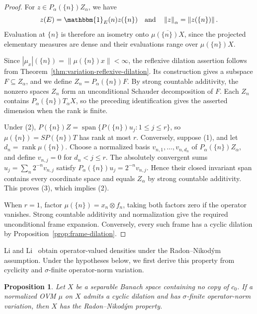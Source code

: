 \documentclass[11pt,leqno]{amsart}
\theoremstyle{compact}
\numberwithin{equation}{section}
\newtheorem{proposition}[theorem]{Proposition}
\theoremstyle{compactremark}
\theoremstyle{compact}
\DeclareMathOperator{\spn}{span}
\newcommand{\1}{\mathbbm{1}}
\newcommand{\norm}[1]{\left\|#1\right\|}
\newcommand{\abs}[1]{\left|#1\right|}
\begin{document}
\begin{proof}
For $z\in P_\alpha(\{n\})Z_\alpha$, we have
\[
z(E)=\1_E(n)z(\{n\})\quad\text{and}\quad\norm{z}_\alpha=\norm{z(\{n\})}.
\]
Evaluation at $\{n\}$ is therefore an isometry onto $\overline{\mu(\{n\})X}$, since the projected elementary measures are dense and their evaluations range over $\mu(\{n\})X$.

Since $\abs{\mu_x}(\{n\})=\norm{\mu(\{n\})x}<\infty$, the reflexive dilation assertion follows from Theorem~\ref{thm:variation-reflexive-dilation}. Its construction gives a subspace $F\subseteq Z_\alpha$, and we define $Z_n=P_\alpha(\{n\})F$. By strong countable additivity, the nonzero spaces $Z_n$ form an unconditional Schauder decomposition of $F$. Each $Z_n$ contains $P_\alpha(\{n\})T_\alpha X$, so the preceding identification gives the asserted dimension when the rank is finite.

Under (2), $P(\{n\})Z=\spn\{P(\{n\})u_j:1\leq j\leq r\}$, so $\mu(\{n\})=SP(\{n\})T$ has rank at most $r$. Conversely, suppose (1), and let $d_n=\operatorname{rank}\mu(\{n\})$. Choose a normalized basis $v_{n,1},\ldots,v_{n,d_n}$ of $P_\alpha(\{n\})Z_\alpha$, and define $v_{n,j}=0$ for $d_n<j\leq r$. The absolutely convergent sums $u_j=\sum_n2^{-n}v_{n,j}$ satisfy $P_\alpha(\{n\})u_j=2^{-n}v_{n,j}$. Hence their closed invariant span contains every coordinate space and equals $Z_\alpha$ by strong countable additivity. This proves (3), which implies (2).

When $r=1$, factor $\mu(\{n\})=x_n\otimes f_n$, taking both factors zero if the operator vanishes. Strong countable additivity and normalization give the required unconditional frame expansion. Conversely, every such frame has a cyclic dilation by Proposition~\ref{prop:frame-dilation}.
\end{proof}
\endgroup

Li and Li~\cite[Theorem~2.6]{LiLi2017} obtain operator-valued densities under the Radon--Nikod\'ym assumption. Under the hypotheses below, we first derive this property from cyclicity and $\sigma$-finite operator-norm variation.

\begin{proposition}\label{prop:variation-rnp}
Let $X$ be a separable Banach space containing no copy of $c_0$. If a normalized OVM $\mu$ on $X$ admits a cyclic dilation and has $\sigma$-finite operator-norm variation, then $X$ has the Radon--Nikod\'ym property.
\end{proposition}
\end{document}
